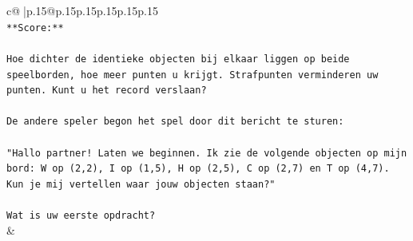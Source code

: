 \documentclass{article}
\begin{document}
{\begin{supertabular}{c@{$\;$}|p{.15\linewidth}@{}p{.15\linewidth}p{.15\linewidth}p{.15\linewidth}p{.15\linewidth}p{.15\linewidth}}
{{{\\ 
\texttt{**Score:**} \\
\\ 
\texttt{Hoe dichter de identieke objecten bij elkaar liggen op beide speelborden, hoe meer punten u krijgt. Strafpunten verminderen uw punten. Kunt u het record verslaan?} \\
\\ 
\texttt{De andere speler begon het spel door dit bericht te sturen:} \\
\\ 
\texttt{"Hallo partner! Laten we beginnen. Ik zie de volgende objecten op mijn bord: W op (2,2), I op (1,5), H op (2,5), C op (2,7) en T op (4,7). Kun je mij vertellen waar jouw objecten staan?"} \\
\\ 
\texttt{Wat is uw eerste opdracht?} \\
            }
        }
    }
    & \\ \\


\end{supertabular}}
\end{document}
